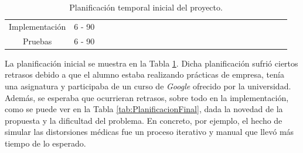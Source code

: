 \begin{table}[htp]
{\begin{tabular}{|c|c|ll|llll|llll|lllll|llll|llll|}
Implementación & 6 - 90 &  &  &  &  &  &  &  &  & & & \cellcolor[HTML]{9B9B9B} & \cellcolor[HTML]{9B9B9B} & \cellcolor[HTML]{9B9B9B} & \cellcolor[HTML]{9B9B9B} & \cellcolor[HTML]{9B9B9B} &  &  &  &  &  &  &  &  \\ \cline{1-1}
Pruebas & 6 - 90 &  &  &  &  &  &  &  &  &  &  &  &  &  &  & & \cellcolor[HTML]{9B9B9B} & \cellcolor[HTML]{9B9B9B} & \cellcolor[HTML]{9B9B9B} & \cellcolor[HTML]{9B9B9B} & &  &  &  \\ \hline
\end{tabular}%
}
\caption{Planificación temporal inicial del proyecto.}
\label{tab:PlanificacionTemporal}
\end{table}

La planificación inicial se muestra en la Tabla \ref{tab:PlanificacionTemporal}. 
Dicha planificación sufrió ciertos retrasos debido a que el alumno estaba realizando prácticas de empresa, tenía 
una asignatura y participaba de un curso de \emph{Google} ofrecido por la universidad.
Además, se esperaba que ocurrieran retrasos, sobre todo en la implementación, 
como se puede ver en la Tabla \ref{tab:PlanificacionFinal}, dada la novedad de la propuesta
y la dificultad del problema. En concreto, por ejemplo, el hecho de simular las distorsiones 
médicas fue un proceso iterativo y manual que llevó más tiempo de lo esperado. 

